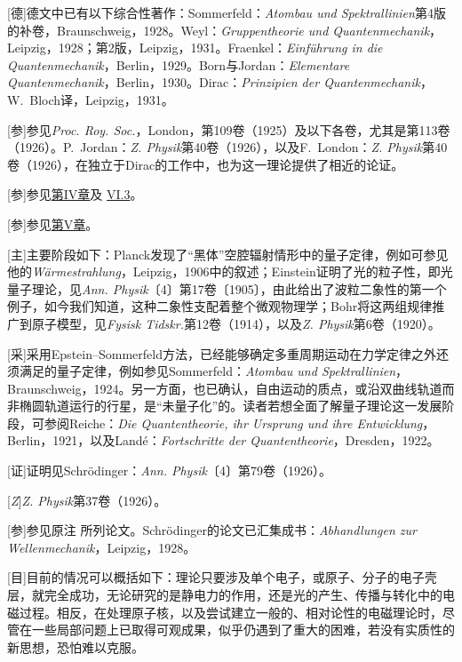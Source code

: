 \documentclass[fontsize=13pt,twoside,openany,headings=normal,parskip=false,bookmarkpackage=false,DIV=calc]{scrbook}
\begin{document}
[德]{\hypertarget{origpage-238}{}\label{origpage-238}德文中已有以下综合性著作：Sommerfeld：\emph{Atombau und Spektrallinien}第4版的补卷，Braunschweig，1928。Weyl：\emph{Gruppentheorie und Quantenmechanik}，Leipzig，1928；第2版，Leipzig，1931。Fraenkel：\emph{Einführung in die Quantenmechanik}，Berlin，1929。Born与Jordan：\emph{Elementare Quantenmechanik}，Berlin，1930。Dirac：\emph{Prinzipien der Quantenmechanik}，W.~Bloch译，Leipzig，1931。}

[参]{参见\emph{Proc. Roy. Soc.}，London，第109卷（1925）及以下各卷，尤其是第113卷（1926）。P.~Jordan：\emph{Z. Physik}第40卷（1926），以及F.~London：\emph{Z. Physik}第40卷（1926），在独立于Dirac的工作中，也为这一理论提供了相近的论证。}

[参]{参见\CJKglue \hyperref[chap:IV]{第IV章}\CJKglue 及 \hyperref[sec:VI.3]{VI.3}。}

[参]{参见\CJKglue \hyperref[chap:V]{第V章}。}

[主]{主要阶段如下：Planck发现了“黑体”空腔辐射情形中的量子定律，例如可参见他的\emph{Wärmestrahlung}，Leipzig，1906中的叙述；Einstein证明了光的粒子性，即光量子理论，见\emph{Ann. Physik}〔4〕第17卷〔1905〕，由此给出了波粒二象性的第一个例子，如今我们知道，这种二象性支配着整个微观物理学；Bohr将这两组规律推广到原子模型，见\emph{Fysisk Tidskr.}第12卷（1914），以及\emph{Z. Physik}第6卷（1920）。}

[采]{采用Epstein–Sommerfeld方法，已经能够确定多重周期运动在力学定律之外还须满足的量子定律，例如参见Sommerfeld：\emph{Atombau und Spektrallinien}，Braunschweig，1924。另一方面，也已确认，自由运动的质点，或沿双曲线轨道而非椭圆轨道运行的行星，是“未量子化”的。读者若想全面了解量子理论这一发展阶段，可参阅Reiche：\emph{Die Quantentheorie, ihr Ursprung und ihre Entwicklung}，Berlin，1921，以及Landé：\emph{Fortschritte der Quantentheorie}，Dresden，1922。}

[证]{证明见Schrödinger：\emph{Ann. Physik}〔4〕第79卷（1926）。}

[\emph{Z}]{\emph{Z. Physik}第37卷（1926）。}

[参]{参见原注 \hyperlink{note-2}{} 所列论文。Schrödinger的论文已汇集成书：\emph{Abhandlungen zur Wellenmechanik}，Leipzig，1928。}

[目]{目前的情况可以概括如下：理论只要涉及单个电子，或原子、分子的电子壳层，就完全成功，无论研究的是静电力的作用，还是光的产生、传播与转化中的电磁过程。相反，在处理原子核，以及尝试建立一般的、相对论性的电磁理论时，尽管在一些局部问题上已取得可观成果，似乎仍遇到了重大的困难，若没有实质性的新思想，恐怕难以克服。}
\end{document}
